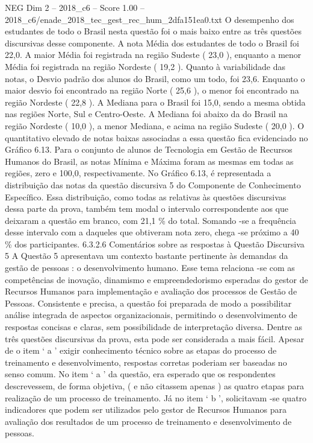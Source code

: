 \begin{textsample}{NEG Dim 2 – 2018\_c6 – Score 1.00 – 2018\_c6/enade\_2018\_tec\_gest\_rec\_hum\_2dfa151ea0.txt}
O desempenho dos estudantes de todo o Brasil nesta questão foi o mais baixo entre as três questões discursivas desse componente.
A nota Média dos estudantes de todo o Brasil foi 22,0.
A maior Média foi registrada na região Sudeste ( 23,0 ), enquanto a menor Média foi registrada na região Nordeste ( 19,2 ).
Quanto à variabilidade das notas, o Desvio padrão dos alunos do Brasil, como um todo, foi 23,6.
Enquanto o maior desvio foi encontrado na região Norte ( 25,6 ), o menor foi encontrado na região Nordeste ( 22,8 ).
A Mediana para o Brasil foi 15,0, sendo a mesma obtida nas regiões Norte, Sul e Centro-Oeste.
A Mediana foi abaixo da do Brasil na região Nordeste ( 10,0 ), a menor Mediana, e acima na região Sudeste ( 20,0 ).
O quantitativo elevado de notas baixas associadas a essa questão fica evidenciado no Gráfico 6.13.
Para o conjunto de alunos de Tecnologia em Gestão de Recursos Humanos do Brasil, as notas Mínima e Máxima foram as mesmas em todas as regiões, zero e 100,0, respectivamente.
No Gráfico 6.13, é representada a distribuição das notas da questão discursiva 5 do Componente de Conhecimento Específico.
Essa distribuição, como todas as relativas às questões discursivas dessa parte da prova, também tem modal o intervalo correspondente aos que deixaram a questão em branco, com 21,1 \% do total.
Somando -se a frequência desse intervalo com a daqueles que obtiveram nota zero, chega -se próximo a 40 \% dos participantes. 6.3.2.6 Comentários sobre as respostas à Questão Discursiva 5 A Questão 5 apresentava um contexto bastante pertinente às demandas da gestão de pessoas : o desenvolvimento humano.
Esse tema relaciona -se com as competências de inovação, dinamismo e empreendedorismo esperadas do gestor de Recursos Humanos para implementação e avaliação dos processos de Gestão de Pessoas.
Consistente e precisa, a questão foi preparada de modo a possibilitar análise integrada de aspectos organizacionais, permitindo o desenvolvimento de respostas concisas e claras, sem possibilidade de interpretação diversa.
Dentre as três questões discursivas da prova, esta pode ser considerada a mais fácil.
Apesar de o item ‘ a ’ exigir conhecimento técnico sobre as etapas do processo de treinamento e desenvolvimento, respostas corretas poderiam ser baseadas no senso comum.
No item ‘ a ’ da questão, era esperado que os respondentes descrevessem, de forma objetiva, ( e não citassem apenas ) as quatro etapas para realização de um processo de treinamento.
Já no item ‘ b ’, solicitavam -se quatro indicadores que podem ser utilizados pelo gestor de Recursos Humanos para avaliação dos resultados de um processo de treinamento e desenvolvimento de pessoas.

\end{textsample}
